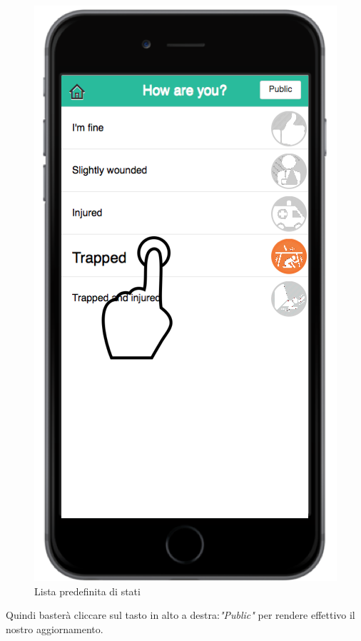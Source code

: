 \begin{itemize}
\begin{figure}[H]
	\includegraphics[scale=1]{interfaccia/comestaitap.png}
	\caption{Lista predefinita di stati}
	\label{fig:lista}
\end{figure}
Quindi basterà cliccare sul tasto in alto a destra:\textit{"Public"} per rendere effettivo il nostro aggiornamento.
\newpage


\end{itemize}
